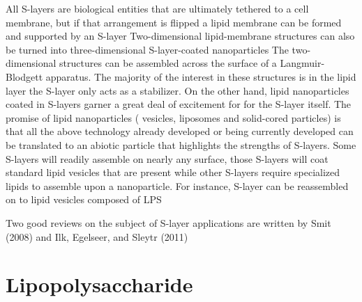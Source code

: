   All \acp{S-layer} are biological entities that are ultimately tethered to a cell membrane, but if that arrangement is flipped a lipid membrane can be formed and supported by an \ac{S-layer} Two-dimensional lipid-membrane structures can also be turned into three-dimensional \ac{S-layer}-coated nanoparticles The two-dimensional structures can be assembled across the surface of a Langmuir-Blodgett apparatus. The majority of the interest in these structures is in the lipid layer the \ac{S-layer} only acts as a stabilizer. On the other hand, lipid nanoparticles coated in \acp{S-layer} garner a great deal of excitement for for the \ac{S-layer} itself. The promise of lipid nanoparticles (\ie{} vesicles, liposomes and solid-cored particles) is that all the above technology already developed or being currently developed can be translated to an abiotic particle that highlights the strengths of \acp{S-layer}. Some \acp{S-layer} will readily assemble on nearly any surface, those \acp{S-layer} will coat standard lipid vesicles that are present while other \acp{S-layer} require specialized lipids to assemble upon a nanoparticle. For instance, \caulobacter \ac{S-layer} can be reassembled on to lipid vesicles composed of \caulobacter{} \ac{LPS} 
  
  Two good reviews on the subject of \ac{S-layer} applications are written by Smit (2008) and Ilk, Egelseer, and Sleytr (2011)

  \section{Lipopolysaccharide}\label{sec:intro-lps}

